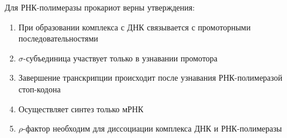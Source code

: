 
Для РНК-полимеразы прокариот верны утверждения:

\begin{enumerate}
    \item При образовании комплекса с ДНК связывается с промоторными последовательностями
    \item $\sigma$-субъединица участвует только в узнавании промотора
    \item Завершение транскрипции происходит после узнавания РНК-полимеразой стоп-кодона
    \item Осуществляет синтез только мРНК
    \item $\rho$-фактор необходим для диссоциации комплекса ДНК и РНК-полимеразы
\end{enumerate}

\explanationSection

